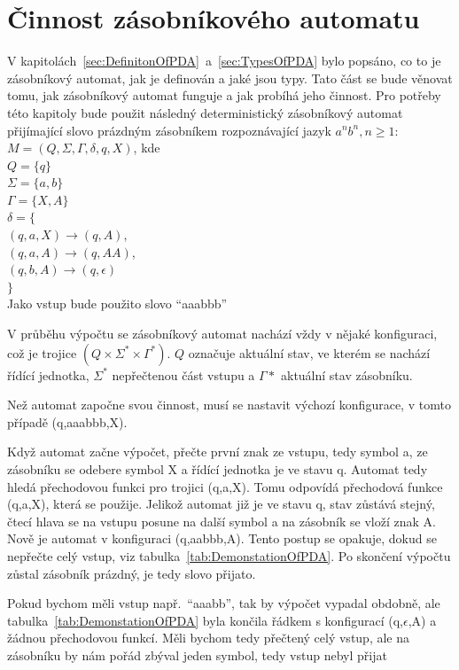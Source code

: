 \section{Činnost zásobníkového automatu}

V kapitolách~\ref{sec:DefinitonOfPDA}~a~\ref{sec:TypesOfPDA} bylo popsáno, co to je zásobníkový automat, jak je definován a jaké jsou typy. Tato část se bude věnovat tomu, jak zásobníkový automat funguje a jak probíhá jeho činnost. Pro potřeby této kapitoly bude použit následný deterministický zásobníkový automat přijímající slovo prázdným zásobníkem rozpoznávající jazyk $a^{n}b^{n}, n \ge 1$:\\
$M = (Q, \Sigma, \Gamma, \delta, q, X)$, kde \\
\indent$Q = \{q\}$\\
\indent$\Sigma = \{a,b\}$\\
\indent$\Gamma = \{X,A\}$\\
\indent$\delta = \{$\\
\indent\indent$(q,a,X) \rightarrow (q,A)$,\\
\indent\indent$(q,a,A) \rightarrow (q,AA)$,\\
\indent\indent$(q,b,A) \rightarrow (q,\epsilon)$\\
\indent$\}$\\
Jako vstup bude použito slovo ``aaabbb''

V průběhu výpočtu se zásobníkový automat nachází vždy v nějaké konfiguraci, což je trojice $(Q \times \Sigma^{*} \times \Gamma^{*})$. $Q$ označuje aktuální stav, ve kterém se nachází řídící jednotka, $\Sigma^{*}$ nepřečtenou část vstupu a $\Gamma{*}$ aktuální stav zásobníku. 

Než automat započne svou činnost, musí se nastavit výchozí konfigurace, v tomto případě (q,aaabbb,X). 

Když automat začne výpočet, přečte první znak ze vstupu, tedy symbol a, ze zásobníku se odebere symbol X a řídící jednotka je ve stavu q. Automat tedy hledá přechodovou funkci pro trojici (q,a,X). Tomu odpovídá přechodová funkce (q,a,X), která se použije. Jelikož automat již je ve stavu q, stav zůstává stejný, čtecí hlava se na vstupu posune na další symbol a na zásobník se vloží znak A. Nově je automat v konfiguraci (q,aabbb,A). Tento postup se opakuje, dokud se nepřečte celý vstup, viz tabulka~\ref{tab:DemonstationOfPDA}. Po skončení výpočtu zůstal zásobník prázdný, je tedy slovo přijato. 

Pokud bychom měli vstup např.\ ``aaabb'', tak by výpočet vypadal obdobně, ale tabulka~\ref{tab:DemonstationOfPDA} byla končila řádkem s konfigurací (q,$\epsilon$,A) a žádnou přechodovou funkcí. Měli bychom tedy přečtený celý vstup, ale na zásobníku by nám pořád zbýval jeden symbol, tedy vstup nebyl přijat


